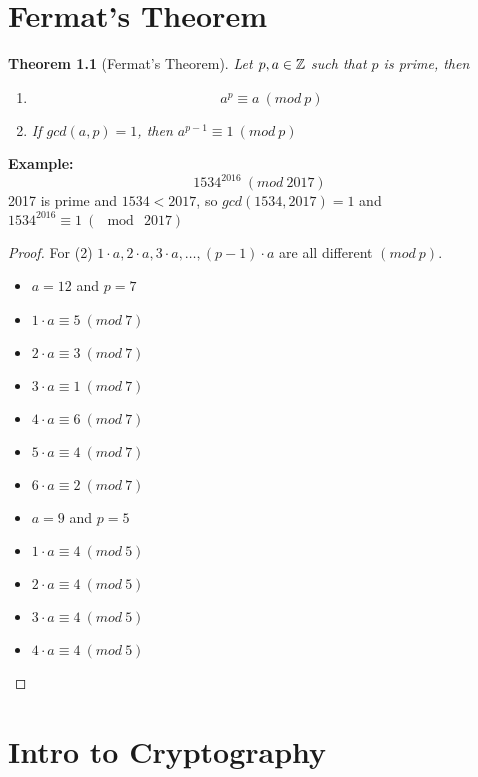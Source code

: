 \documentclass[openany]{report}
\newtheorem{theorem}{Theorem}[section]
\begin{document}
\chapter{Fermat's Theorem}
\begin{theorem}[Fermat's Theorem]
    Let $p,a \in \mathbb{Z}$ such that $p$ is prime, then 
    \begin{enumerate}
        \item
    $$a^p \equiv a \ (mod \ p)$$
        \item
    If $gcd(a,p) = 1$, then $a^{p-1} \equiv 1 \ (mod \ p)$
        
    \end{enumerate}
\end{theorem}
\textbf{Example:} 
$$1534^{2016} \ (mod \ 2017)$$
2017 is prime and $1534 < 2017$, so $gcd(1534, 2017) = 1$ and $1534^2016 \equiv 1 \ (\mod \ 2017)$
\begin{proof}For (2)
$1 \cdot a, 2\cdot a, 3 \cdot a, \dots, (p-1)\cdot a$ are all different $(mod \ p)$. 
\raggedcolumns
\begin{multicols}{2}
\begin{itemize}
    \item $a = 12$ and $p = 7$
    \item $1 \cdot a \equiv 5 \ (mod \ 7)$
    \item $2 \cdot a \equiv 3 \ (mod \ 7)$
    \item $3 \cdot a \equiv 1 \ (mod \ 7)$
    \item $4 \cdot a \equiv 6 \ (mod \ 7)$
    \item $5 \cdot a \equiv 4 \ (mod \ 7)$
    \item $6 \cdot a \equiv 2 \ (mod \ 7)$
\end{itemize}
\columnbreak
\begin{itemize}
    \item $a = 9$ and $p = 5$
    \item $1 \cdot a \equiv 4 \ (mod \ 5)$
    \item $2 \cdot a \equiv 4 \ (mod \ 5)$
    \item $3 \cdot a \equiv 4 \ (mod \ 5)$
    \item $4 \cdot a \equiv 4 \ (mod \ 5)$
\end{itemize}
\end{multicols}



\end{proof}

\chapter{Intro to Cryptography}
\end{document}
